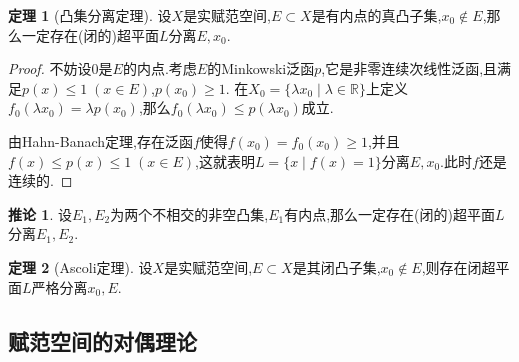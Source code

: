 \documentclass{ctexart}
\theoremstyle{definition}
\newtheorem{theorem}{定理}
\newtheorem{corollary}{推论}
\theoremstyle{remark}
\begin{document}
	\begin{theorem}[凸集分离定理]
		设$X$是实赋范空间,$E\subset X$是有内点的真凸子集,$x_0\notin E$,那么一定存在(闭的)超平面$L$分离$E,x_0$.
	\end{theorem}
	\begin{proof}
		不妨设$0$是$E$的内点.考虑$E$的Minkowski泛函$p$,它是非零连续次线性泛函,且满足$p(x)\le 1\;(x\in E)$,$p(x_0)\ge 1$.
		在$X_0=\{\lambda x_0\mid\lambda\in\mathbb{R}\}$上定义$f_0(\lambda x_0)=\lambda p(x_0)$,那么$f_0(\lambda x_0)\le p(\lambda x_0)$成立.
		
		由Hahn-Banach定理,存在泛函$f$使得$f(x_0)=f_0(x_0)\ge 1$,并且$f(x)\le p(x)\le 1\;(x\in E)$,这就表明$L=\{x\mid f(x)=1\}$分离$E,x_0$.此时$f$还是连续的.
	\end{proof}
	\begin{corollary}
		设$E_1,E_2$为两个不相交的非空凸集,$E_1$有内点,那么一定存在(闭的)超平面$L$分离$E_1,E_2$.
	\end{corollary}
	\begin{theorem}[Ascoli定理]
		设$X$是实赋范空间,$E\subset X$是其闭凸子集,$x_0\notin E$,则存在闭超平面$L$严格分离$x_0,E$.
	\end{theorem}
	
	\subsection{赋范空间的对偶理论}
	
\end{document}

